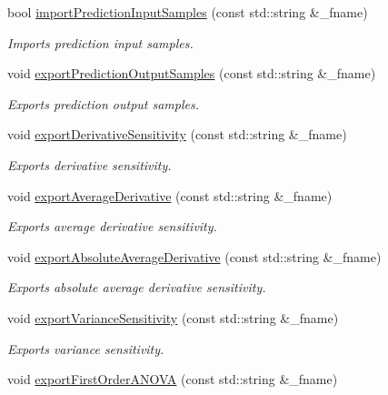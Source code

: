 \begin{DoxyCompactItemize}
bool \hyperlink{class_go_s_u_m_1_1_c_container_a16c0009b13b5254c490d6fb2d44bcf5f}{import\-Prediction\-Input\-Samples} (const std\-::string \&\-\_\-fname)
\begin{DoxyCompactList}\small\item\em Imports prediction input samples. \end{DoxyCompactList}\item 
void \hyperlink{class_go_s_u_m_1_1_c_container_a8fb751f43be001ae0ca8225d7e1ee3fc}{export\-Prediction\-Output\-Samples} (const std\-::string \&\-\_\-fname)
\begin{DoxyCompactList}\small\item\em Exports prediction output samples. \end{DoxyCompactList}\item 
void \hyperlink{class_go_s_u_m_1_1_c_container_a00edafdcfc7924119e45b42d6373fb6c}{export\-Derivative\-Sensitivity} (const std\-::string \&\-\_\-fname)
\begin{DoxyCompactList}\small\item\em Exports derivative sensitivity. \end{DoxyCompactList}\item 
void \hyperlink{class_go_s_u_m_1_1_c_container_ae73c0dff9ed97b6a9a8bddd93b3d7cb4}{export\-Average\-Derivative} (const std\-::string \&\-\_\-fname)
\begin{DoxyCompactList}\small\item\em Exports average derivative sensitivity. \end{DoxyCompactList}\item 
void \hyperlink{class_go_s_u_m_1_1_c_container_a6280676048025d0a46d5d5d145661329}{export\-Absolute\-Average\-Derivative} (const std\-::string \&\-\_\-fname)
\begin{DoxyCompactList}\small\item\em Exports absolute average derivative sensitivity. \end{DoxyCompactList}\item 
void \hyperlink{class_go_s_u_m_1_1_c_container_ae5621e54df5c608f284aa9abff6f7df3}{export\-Variance\-Sensitivity} (const std\-::string \&\-\_\-fname)
\begin{DoxyCompactList}\small\item\em Exports variance sensitivity. \end{DoxyCompactList}\item 
void \hyperlink{class_go_s_u_m_1_1_c_container_a2235f551c8a677cd031934a91bd9813f}{export\-First\-Order\-A\-N\-O\-V\-A} (const std\-::string \&\-\_\-fname)

\end{DoxyCompactItemize}
